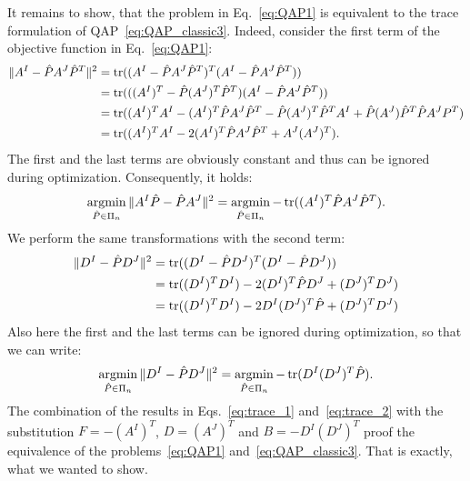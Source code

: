 It remains to show, that the problem in Eq.~\eqref{eq:QAP1} is equivalent to the trace formulation of QAP~\eqref{eq:QAP_classic3}. Indeed, consider the first term of the objective function in Eq.~\eqref{eq:QAP1}:
\begin{align*}
\|A^I-\hat{P}A^J\hat{P}^T\|^2 &= \mathop{\rm tr}((A^I-\hat{P}A^J\hat{P}^T)^T(A^I-\hat{P}A^J\hat{P}^T)) \notag\\
							  &= \mathop{\rm tr}(((A^I)^T-\hat{P}(A^J)^T\hat{P}^T)(A^I-\hat{P}A^J\hat{P}^T)) \notag\\
							  &= \mathop{\rm tr}((A^I)^TA^I-(A^I)^T\hat{P}A^J\hat{P}^T-\hat{P}(A^J)^T\hat{P}^TA^I+\hat{P}(A^J)\hat{P}^T\hat{P}A^JP^T) \notag\\
							  &= \mathop{\rm tr}((A^I)^TA^I-2(A^I)^T\hat{P}A^J\hat{P}^T+A^J(A^J)^T).
\end{align*}
The first and the last terms are obviously constant and thus can be ignored during optimization. Consequently, it holds:
\begin{equation}\label{eq:trace_1}
\mathop{\rm argmin}_{\hat{P}\in\Pi_n}\|A^I\hat{P}-\hat{P}A^J\|^2 = \mathop{\rm argmin}_{\hat{P}\in\Pi_n}-\mathop{\rm tr}((A^I)^T\hat{P}A^J\hat{P}^T).
\end{equation}
We perform the same transformations with the second term:
\begin{align*}
\|D^I-\hat{P}D^J\|^2 &= \mathop{\rm tr}((D^I-\hat{P}D^J)^T(D^I-\hat{P}D^J)) \notag\\
					 &= \mathop{\rm tr}((D^I)^TD^I)-2(D^I)^T\hat{P}D^J+(D^J)^TD^J) \notag\\
					 &= \mathop{\rm tr}((D^I)^TD^I)-2D^I(D^J)^T\hat{P}+(D^J)^TD^J) 
\end{align*} 
Also here the first and the last terms can be ignored during optimization, so that we can write:
\begin{equation}\label{eq:trace_2}
\mathop{\rm argmin}_{\hat{P}\in\Pi_n}\|D^I-\hat{P}D^J\|^2=\mathop{\rm argmin}_{\hat{P}\in\Pi_n}-\mathop{\rm tr}(D^I(D^J)^T\hat{P}).
\end{equation}
The combination of the results in Eqs.~\eqref{eq:trace_1} and~\eqref{eq:trace_2} with the substitution $F=-(A^I)^T$, $D=(A^J)^T$ and $B=-D^I(D^J)^T$ proof the equivalence of the problems~\eqref{eq:QAP1} and~\eqref{eq:QAP_classic3}. That is exactly, what we wanted to show.



